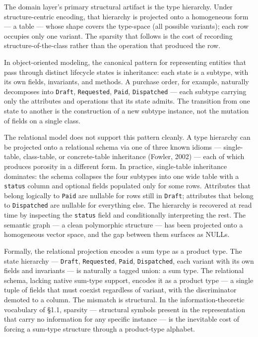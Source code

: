 \documentclass[
]{article}
\let\origtexttt\texttt%
\renewcommand{\texttt}[1]{\origtexttt{\seqsplit{#1}}}%
\let\texttt\origtexttt%
\begin{document}
The domain layer's primary structural artifact is the type hierarchy.
Under structure-centric encoding, that hierarchy is projected onto a
homogeneous form --- a table --- whose shape covers the type-space (all
possible variants); each row occupies only one variant. The sparsity
that follows is the cost of recording structure-of-the-class rather than
the operation that produced the row.

In object-oriented modeling, the canonical pattern for representing
entities that pass through distinct lifecycle states is inheritance:
each state is a subtype, with its own fields, invariants, and methods. A
purchase order, for example, naturally decomposes into \texttt{Draft},
\texttt{Requested}, \texttt{Paid}, \texttt{Dispatched} --- each subtype
carrying only the attributes and operations that its state admits. The
transition from one state to another is the construction of a new
subtype instance, not the mutation of fields on a single class.

The relational model does not support this pattern cleanly. A type
hierarchy can be projected onto a relational schema via one of three
known idioms --- single-table, class-table, or concrete-table
inheritance (Fowler, 2002) --- each of which produces porosity in a
different form. In practice, single-table inheritance dominates: the
schema collapses the four subtypes into one wide table with a
\texttt{status} column and optional fields populated only for some rows.
Attributes that belong logically to \texttt{Paid} are nullable for rows
still in \texttt{Draft}; attributes that belong to \texttt{Dispatched}
are nullable for everything else. The hierarchy is recovered at read
time by inspecting the \texttt{status} field and conditionally
interpreting the rest. The semantic graph --- a clean polymorphic
structure --- has been projected onto a homogeneous vector space, and
the gap between them surfaces as NULLs.

Formally, the relational projection encodes a sum type as a product
type. The state hierarchy --- \texttt{Draft}, \texttt{Requested},
\texttt{Paid}, \texttt{Dispatched}, each variant with its own fields and
invariants --- is naturally a tagged union: a sum type. The relational
schema, lacking native sum-type support, encodes it as a product type
--- a single tuple of fields that must coexist regardless of variant,
with the discriminator demoted to a column. The mismatch is structural.
In the information-theoretic vocabulary of §1.1, sparsity --- structural
symbols present in the representation that carry no information for any
specific instance --- is the inevitable cost of forcing a sum-type
structure through a product-type alphabet.
\end{document}
